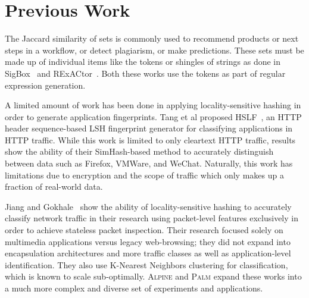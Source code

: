 \section{Previous Work}

The Jaccard similarity of sets is commonly used to recommend products or next steps in a workflow, or detect plagiarism, or make predictions. These sets must be made up of individual items like the tokens or shingles of strings as done in SigBox~\cite{Shim2017SigBoxAS} and RExACtor~\cite{rexactor}. Both these works use the tokens as part of regular expression generation.

A limited amount of work has been done in applying locality-sensitive hashing in order to generate application fingerprints. Tang et al proposed HSLF~\cite{hslf}, an HTTP header sequence-based LSH fingerprint generator for classifying applications in HTTP traffic. While this work is limited to only cleartext HTTP traffic, results show the ability of their SimHash-based method to accurately distinguish between data such as Firefox, VMWare, and WeChat. Naturally, this work has limitations due to encryption and the scope of traffic which only makes up a fraction of real-world data.

Jiang and Gokhale~\cite{fpga} show the ability of locality-sensitive hashing to accurately classify network traffic in their research using packet-level features exclusively in order to achieve stateless packet inspection. Their research focused solely on multimedia applications versus legacy web-browsing; they did not expand into encapsulation architectures and more traffic classes as well as application-level identification. They also use K-Nearest Neighbors clustering for classification, which is known to scale sub-optimally. \textsc{Alpine} and \textsc{Palm} expand these works into a much more complex and diverse set of experiments and applications.
